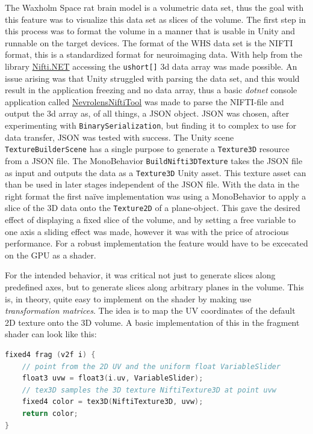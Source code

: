 The Waxholm Space rat brain model is a volumetric data set, thus the goal with this feature was to visualize this data set as slices of the volume. The first step in this process was to format the volume in a manner that is usable in Unity and runnable on the target devices. The format of the WHS data set is the NIFTI format, this is a standardized format for neuroimaging data. With help from the library \href{https://github.com/plwp/Nifti.NET}{Nifti.NET} accessing the \texttt{ushort[]} 3d data array was made possible. An issue arising was that Unity struggled with parsing the data set, and this would result in the application freezing and no data array, thus a basic \textit{dotnet} console application called \href{https://github.com/ovravna/NevrolensNiftiTool}{NevrolensNiftiTool} was made to parse the NIFTI-file and output the 3d array as, of all things, a JSON object. JSON was chosen, after experimenting with \texttt{BinarySerialization}, but finding it to complex to use for data transfer, JSON was tested with success. The Unity scene \texttt{TextureBuilderScene} has a single purpose to generate a \texttt{Texture3D} resource from a JSON file. The MonoBehavior \texttt{BuildNifti3DTexture} takes the JSON file as input and outputs the data as a \texttt{Texture3D} Unity asset. This texture asset can than be used in later stages independent of the JSON file. 
With the data in the right format the first naïve implementation was using a MonoBehavior to apply a slice of the 3D data onto the \texttt{Texture2D} of a plane-object. This gave the desired effect of displaying a fixed slice of the volume, and by setting a free variable to one axis a sliding effect was made, however it was with the price of atrocious performance. For a robust implementation the feature would have to be excecated on the GPU as a shader. 

For the intended behavior, it was critical not just to generate slices along predefined axes, but to generate slices along arbitrary planes in the volume. This is, in theory, quite easy to implement on the shader by making use \textit{transformation matrices}. The idea is to map the UV coordinates of the default 2D texture onto the 3D volume. A basic implementation of this in the fragment shader can look like this:
\begin{lstlisting}[language=c]
fixed4 frag (v2f i) {
    // point from the 2D UV and the uniform float VariableSlider
    float3 uvw = float3(i.uv, VariableSlider);
    // tex3D samples the 3D texture NiftiTexture3D at point uvw
    fixed4 color = tex3D(NiftiTexture3D, uvw);
    return color;
}
\end{lstlisting}

